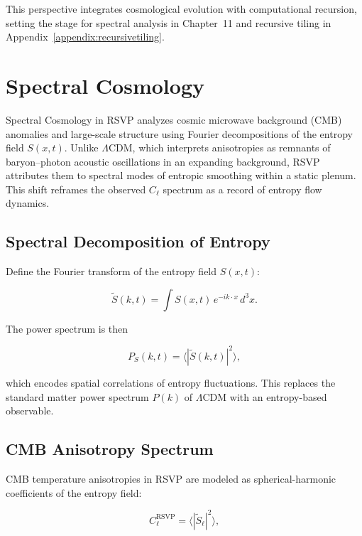 \documentclass[12pt]{report}
\begin{document}
This perspective integrates cosmological evolution with computational recursion, setting the stage for spectral analysis in Chapter~11 and recursive tiling in Appendix~\ref{appendix:recursivetiling}.


\chapter{Spectral Cosmology}

Spectral Cosmology in RSVP analyzes cosmic microwave background (CMB) anomalies and large-scale structure using Fourier decompositions of the entropy field $S(x,t)$.  
Unlike $\Lambda$CDM, which interprets anisotropies as remnants of baryon--photon acoustic oscillations in an expanding background, RSVP attributes them to spectral modes of entropic smoothing within a static plenum. This shift reframes the observed $C_\ell$ spectrum as a record of entropy flow dynamics.

\section{Spectral Decomposition of Entropy}

Define the Fourier transform of the entropy field $S(x,t)$:

\begin{equation}
\tilde{S}(k,t) = \int S(x,t)\, e^{-i k \cdot x}\, d^3x.
\label{eq:entropy-fourier}
\end{equation}

The power spectrum is then

\begin{equation}
P_S(k,t) = \langle |\tilde{S}(k,t)|^2 \rangle,
\end{equation}

which encodes spatial correlations of entropy fluctuations.  
This replaces the standard matter power spectrum $P(k)$ of $\Lambda$CDM with an entropy-based observable.

\section{CMB Anisotropy Spectrum}

CMB temperature anisotropies in RSVP are modeled as spherical-harmonic coefficients of the entropy field:

\begin{equation}
C_\ell^{\text{RSVP}} = \langle |\tilde{S}_\ell|^2 \rangle,
\label{eq:cmb}
\end{equation}
\end{document}
